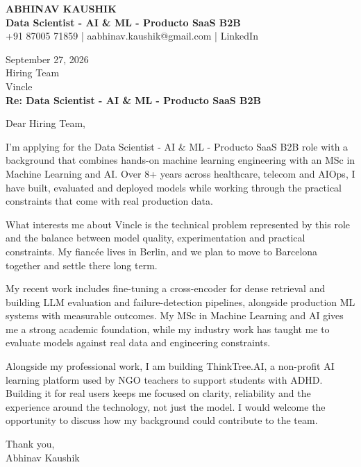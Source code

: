 \documentclass[10pt,a4paper]{article}
\begin{document}
\begin{center}
{\Large\bfseries ABHINAV KAUSHIK}\\[2pt]
{\bfseries Data Scientist - AI \& ML - Producto SaaS B2B}\\[2pt]
+91 87005 71859 \quad | \quad aabhinav.kaushik@gmail.com \quad | \quad LinkedIn
\end{center}
\vspace{8pt}
September 27, 2026\\[6pt]
Hiring Team\\
Vincle\\[4pt]
\textbf{Re: Data Scientist - AI \& ML - Producto SaaS B2B}

Dear Hiring Team,

I’m applying for the Data Scientist - AI \& ML - Producto SaaS B2B role with a background that combines hands-on machine learning engineering with an MSc in Machine Learning and AI. Over 8+ years across healthcare, telecom and AIOps, I have built, evaluated and deployed models while working through the practical constraints that come with real production data.

What interests me about Vincle is the technical problem represented by this role and the balance between model quality, experimentation and practical constraints. My fiancée lives in Berlin, and we plan to move to Barcelona together and settle there long term.

My recent work includes fine-tuning a cross-encoder for dense retrieval and building LLM evaluation and failure-detection pipelines, alongside production ML systems with measurable outcomes. My MSc in Machine Learning and AI gives me a strong academic foundation, while my industry work has taught me to evaluate models against real data and engineering constraints.

Alongside my professional work, I am building ThinkTree.AI, a non-profit AI learning platform used by NGO teachers to support students with ADHD. Building it for real users keeps me focused on clarity, reliability and the experience around the technology, not just the model. I would welcome the opportunity to discuss how my background could contribute to the team.

Thank you,\\
Abhinav Kaushik
\end{document}
